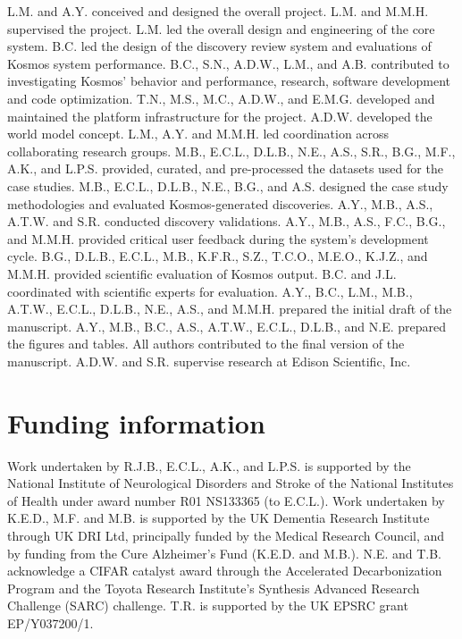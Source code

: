 \documentclass{article}
\begin{document}
L.M. and A.Y. conceived and designed the overall project. L.M. and M.M.H. supervised the project. L.M. led the overall design and engineering of the core system. B.C. led the design of the discovery review system and evaluations of Kosmos system performance. B.C., S.N., A.D.W., L.M., and A.B. contributed to investigating Kosmos' behavior and performance, research, software development and code optimization. T.N., M.S., M.C., A.D.W., and E.M.G. developed and maintained the platform infrastructure for the project. A.D.W. developed the world model concept. L.M., A.Y. and M.M.H. led coordination across collaborating research groups. M.B., E.C.L., D.L.B., N.E., A.S., S.R., B.G., M.F., A.K., and L.P.S. provided, curated, and pre-processed the datasets used for the case studies. M.B., E.C.L., D.L.B., N.E., B.G., and A.S. designed the case study methodologies and evaluated Kosmos-generated discoveries. 
A.Y., M.B., A.S., A.T.W. and S.R. conducted discovery validations. A.Y., M.B., A.S., F.C., B.G., and M.M.H. provided critical user feedback during the system's development cycle. B.G., D.L.B., E.C.L., M.B., K.F.R., S.Z., T.C.O., M.E.O., K.J.Z., and M.M.H. provided scientific evaluation of Kosmos output. B.C. and J.L. coordinated with scientific experts for evaluation. A.Y., B.C., L.M., M.B., A.T.W., E.C.L., D.L.B., N.E., A.S., and M.M.H. prepared the initial draft of the manuscript. A.Y., M.B., B.C., A.S., A.T.W., E.C.L., D.L.B., and N.E. prepared the figures and tables. All authors contributed to the final version of the manuscript. A.D.W. and S.R. supervise research at Edison Scientific, Inc.

\section{Funding information}

Work undertaken by R.J.B., E.C.L., A.K., and L.P.S. is supported by the National Institute of Neurological Disorders and Stroke of the National Institutes of Health under award number R01 NS133365 (to E.C.L.). Work undertaken by K.E.D., M.F. and M.B. is supported by the UK Dementia Research Institute through UK DRI Ltd, principally funded by the Medical Research Council, and by funding from the Cure Alzheimer’s Fund (K.E.D. and M.B.). N.E. and T.B. acknowledge a CIFAR catalyst award through the Accelerated Decarbonization Program and the Toyota Research Institute’s Synthesis Advanced Research Challenge (SARC) challenge. T.R. is supported by the UK EPSRC grant EP/Y037200/1.
\end{document}
